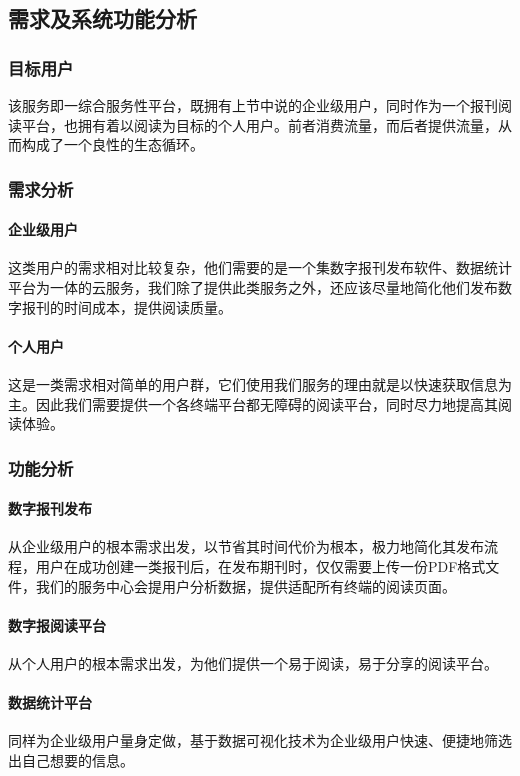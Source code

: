 
\subsection{需求及系统功能分析}
\subsubsection{目标用户}
该服务即一综合服务性平台，既拥有上节中说的企业级用户，同时作为一个报刊阅读平台，也拥有着以阅读为目标的个人用户。前者消费流量，而后者提供流量，从而构成了一个良性的生态循环。

\subsubsection{需求分析}
\paragraph{企业级用户}
这类用户的需求相对比较复杂，他们需要的是一个集数字报刊发布软件、数据统计平台为一体的云服务，我们除了提供此类服务之外，还应该尽量地简化他们发布数字报刊的时间成本，提供阅读质量。

\paragraph{个人用户}
这是一类需求相对简单的用户群，它们使用我们服务的理由就是以快速获取信息为主。因此我们需要提供一个各终端平台都无障碍的阅读平台，同时尽力地提高其阅读体验。

\subsubsection{功能分析}
\paragraph{数字报刊发布}
从企业级用户的根本需求出发，以节省其时间代价为根本，极力地简化其发布流程，用户在成功创建一类报刊后，在发布期刊时，仅仅需要上传一份PDF格式文件，我们的服务中心会提用户分析数据，提供适配所有终端的阅读页面。

\paragraph{数字报阅读平台}
从个人用户的根本需求出发，为他们提供一个易于阅读，易于分享的阅读平台。

\paragraph{数据统计平台}
同样为企业级用户量身定做，基于数据可视化技术为企业级用户快速、便捷地筛选出自己想要的信息。

